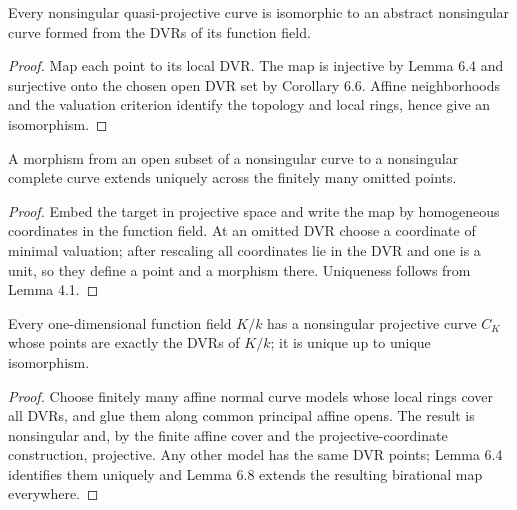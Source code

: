 \begin{proposition}
\label{prop:ha-ch1-6-7}
Every nonsingular quasi-projective curve is isomorphic to an abstract nonsingular curve formed from
the DVRs of its function field.
\end{proposition}
\begin{proof}
Map each point to its local DVR.  The map is injective by Lemma 6.4 and surjective onto the chosen
open DVR set by Corollary 6.6.  Affine neighborhoods and the valuation criterion identify the
topology and local rings, hence give an isomorphism.
\end{proof}

\begin{proposition}
\label{prop:ha-ch1-6-8}
A morphism from an open subset of a nonsingular curve to a nonsingular complete curve extends
uniquely across the finitely many omitted points.
\end{proposition}
\begin{proof}
Embed the target in projective space and write the map by homogeneous coordinates in the function
field.  At an omitted DVR choose a coordinate of minimal valuation; after rescaling all coordinates
lie in the DVR and one is a unit, so they define a point and a morphism there.  Uniqueness follows
from Lemma 4.1.
\end{proof}

\begin{theorem}
\label{thm:ha-ch1-6-9}
Every one-dimensional function field $K/k$ has a nonsingular projective curve $C_K$ whose points
are exactly the DVRs of $K/k$; it is unique up to unique isomorphism.
\end{theorem}
\begin{proof}
Choose finitely many affine normal curve models whose local rings cover all DVRs, and glue them
along common principal affine opens.  The result is nonsingular and, by the finite affine cover
and the projective-coordinate construction, projective.  Any other model has the same DVR points;
Lemma 6.4 identifies them uniquely and Lemma 6.8 extends the resulting birational map everywhere.
\end{proof}

